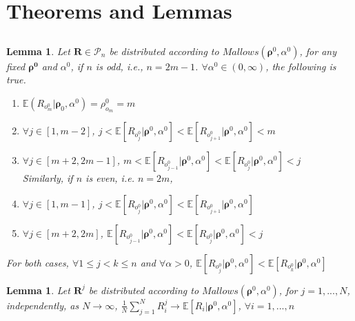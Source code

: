 \documentclass[11pt, oneside]{article}   	%
\newtheorem{lemma}[theorem]{Lemma}
\begin{document}
\section{Theorems and Lemmas}
\subsection{ }
\begin{lemma} \label{lem:nocross}
Let $\bm{R}\in \mathcal{P}_n$ be distributed according to $Mallows(\bm{\rho}^0, \alpha^0)$, for any fixed $\bm{\rho^0}$ and $\alpha^0$, if $n$ is odd, i.e., $n = 2m - 1$. $\forall \alpha^0 \in (0, \infty)$, the following is true.

	\begin{enumerate} 
		\item{$\mathbb{E}(R_{o^0_m}|\bm{\rho}_{0}, \alpha^0) = \rho^0_{o_m} = m$ }
		\item{$\forall j \in [1, m-2]$, $j< \mathbb{E}[R_{o^0_j}|\bm{\rho}^0, \alpha^0] <\mathbb{E}[R_{o^0_{j+1}}|\bm{\rho}^0, \alpha^0] < m$}
		\item{$\forall j \in [m+2, 2m-1]$, $m< \mathbb{E}[R_{o^0_{j-1}}|\bm{\rho}^0, \alpha^0] <\mathbb{E}[R_{o^0_{j}}|\bm{\rho}^0, \alpha^0] < j$}\\		
Similarly, if $n$ is even, i.e. $n = 2m$, 

	\item{$\forall j \in [1, m-1]$, $j< \mathbb{E}[R_{o^0_j}|\bm{\rho}^0, \alpha^0] <\mathbb{E}[R_{o^0_{j+1}}|\bm{\rho}^0, \alpha^0]$}
	\item{$\forall j \in [m+2, 2m]$, $\mathbb{E}[R_{o^0_{j-1}}|\bm{\rho}^0, \alpha^0] <\mathbb{E}[R_{o^0_{j}}|\bm{\rho}^0, \alpha^0] < j$}
\end{enumerate}
For both cases, $\forall 1\leq j<k\leq n$ and $\forall \alpha > 0 $,
{$\mathbb{E}[R_{o^0_j}|\bm{\rho}^0, \alpha^0]<\mathbb{E}[R_{o^0_k}|\bm{\rho}^0, \alpha^0]$}
\end{lemma}

\begin{lemma}\label{lem:largenumbers}
 Let $\bm{R}^j$ be distributed according to $Mallows (\bm{\rho}^0, \alpha^0)$, for $j = 1, ...,N$, independently, as $N \rightarrow \infty$, $\frac{1}{N}\sum\limits_{j=1}^{N}R^j_i \rightarrow \mathbb{E}[R_i|\bm{\rho}^0, \alpha ^0]$, $\forall i = 1, ..., n$
\end{lemma}
\end{document}

